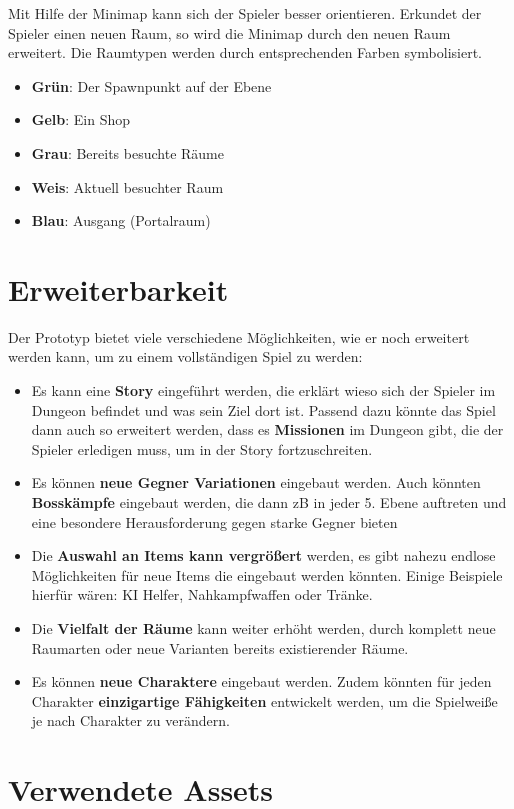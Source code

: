 Mit Hilfe der Minimap kann sich der Spieler besser orientieren. Erkundet der Spieler einen neuen Raum, so wird die Minimap durch den neuen Raum erweitert. Die Raumtypen werden durch entsprechenden Farben symbolisiert.

\begin{itemize}
\item \textbf{Grün}: Der Spawnpunkt auf der Ebene
\item \textbf{Gelb}: Ein Shop
\item \textbf{Grau}: Bereits besuchte Räume
\item \textbf{Weis}: Aktuell besuchter Raum
\item \textbf{Blau}: Ausgang (Portalraum)
\end{itemize}



\section{Erweiterbarkeit}
Der Prototyp bietet viele verschiedene Möglichkeiten, wie er noch erweitert werden kann, um zu einem vollständigen Spiel zu werden:
\begin{itemize}
\item Es kann eine \textbf{Story} eingeführt werden, die erklärt wieso sich der Spieler im Dungeon befindet und was sein Ziel dort ist. Passend dazu könnte das Spiel dann auch so erweitert werden, dass es \textbf{Missionen} im Dungeon gibt, die der Spieler erledigen muss, um in der Story fortzuschreiten.
\item Es können \textbf{neue Gegner Variationen} eingebaut werden. Auch könnten \textbf{Bosskämpfe} eingebaut werden, die dann zB in jeder 5. Ebene auftreten und eine besondere Herausforderung gegen starke Gegner bieten
\item Die \textbf{Auswahl an Items kann vergrößert} werden, es gibt nahezu endlose Möglichkeiten für neue Items die eingebaut werden könnten. Einige Beispiele hierfür wären: KI Helfer, Nahkampfwaffen oder Tränke.
\item Die \textbf{Vielfalt der Räume} kann weiter erhöht werden, durch komplett neue Raumarten oder neue Varianten bereits existierender Räume.
\item Es können \textbf{neue Charaktere} eingebaut werden. Zudem könnten für jeden Charakter \textbf{einzigartige Fähigkeiten} entwickelt werden, um die Spielweiße je nach Charakter zu verändern.
\end{itemize}

\section{Verwendete Assets}



